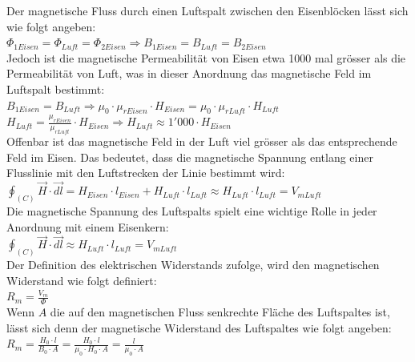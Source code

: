 \begin{minipage}{0.8 \linewidth}
Der magnetische Fluss durch einen Luftspalt zwischen den Eisenblöcken lässt sich wie folgt angeben:\\

$\Phi_{1Eisen} = \Phi_{Luft} = \Phi_{2Eisen} \Rightarrow B_{1Eisen} =  B_{Luft} = B_{2Eisen}$ \\

Jedoch ist die magnetische Permeabilität von Eisen etwa 1000 mal grösser als die Permeabilität von Luft, was in dieser Anordnung das magnetische Feld im Luftspalt bestimmt: \\

$B_{1Eisen} = B_{Luft} \Rightarrow \mu_{0} \cdot \mu_{rEisen} \cdot H_{Eisen} = \mu_0 \cdot \mu_{rLuft} \cdot H_{Luft}$ \\

$H_{Luft} = \frac{\mu_{rEisen}}{\mu_{rLuft}} \cdot H_{Eisen} \Rightarrow H_{Luft} \approx 1'000 \cdot H_{Eisen}$ \\

Offenbar ist das magnetische Feld in der Luft viel grösser als das entsprechende Feld im Eisen. Das bedeutet, dass die magnetische Spannung entlang einer Flusslinie mit den Luftstrecken der Linie bestimmt wird: \\

$\oint_{(C)} \vec{H} \cdot \vec{dl} = H_{Eisen} \cdot l_{Eisen} + H_{Luft} \cdot l_{Luft} \approx H_{Luft} \cdot l_{Luft} = V_{mLuft}$ \\

Die magnetische Spannung des Luftspalts spielt eine wichtige Rolle in jeder Anordnung mit einem Eisenkern: \\

$\oint_{(C)} \vec{H} \cdot \vec{dl} \approx H_{Luft} \cdot l_{Luft} = V_{mLuft}$ \\

Der Definition des elektrischen Widerstands zufolge, wird den magnetischen Widerstand wie folgt definiert: \\

$R_m = \frac{V_m}{\Phi}$ \\

Wenn $A$ die auf den magnetischen Fluss senkrechte Fläche des Luftspaltes ist, lässt sich denn der magnetische Widerstand des Luftspaltes wie folgt angeben: \\

$R_m = \frac{H_0 \cdot l}{B_0 \cdot A} = \frac{H_0 \cdot l}{\mu_0 \cdot H_0 \cdot A} = \frac{l}{\mu_0 \cdot A}$
 \end{minipage}

